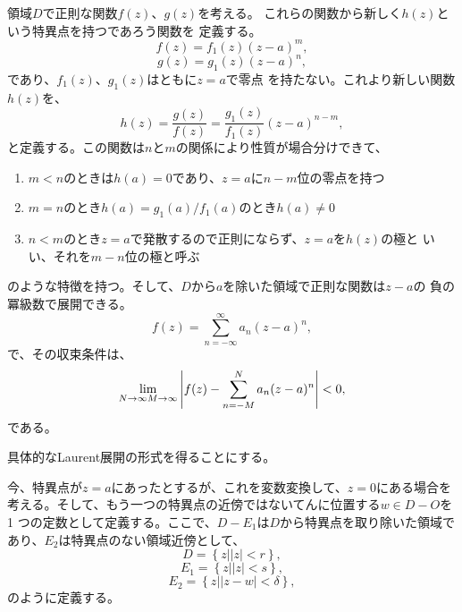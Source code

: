 領域$D$で正則な関数$f(z)$、$g(z)$を考える。
これらの関数から新しく$h(z)$という特異点を持つであろう関数を
定義する。
\begin{equation}
 f(z) = f_1 (z) (z - a)^m,
\end{equation}
\begin{equation}
 g(z) = g_1 (z) (z - a)^n,
\end{equation}
であり、$f_1(z)$、$g_1(z)$はともに$z=a$で零点
を持たない。これより新しい関数$h(z)$を、
\begin{equation}
 h(z) = \frac{g (z)}{f (z) }
  = \frac{g_1(z)}{f_1(z)}(z - a)^{n-m},
\end{equation}
と定義する。この関数は$n$と$m$の関係により性質が場合分けできて、

\begin{enumerate}
 \item $m < n$のときは$h(a)=0$であり、$z=a$に$n-m$位の零点を持つ
 \item $m=n$のとき$h(a)=g_1(a)/f_1(a)$のとき$h(a)\ne 0$
 \item $n < m$のとき$z=a$で発散するので正則にならず、$z=a$を$h(z)$の極と
       いい、それを$m-n$位の極と呼ぶ
\end{enumerate}
のような特徴を持つ。そして、$D$から$a$を除いた領域で正則な関数は$z-a$の
負の冪級数で展開できる。
\begin{equation}
 f(z) = \sum_{n=-\infty}^{\infty}
  a_n (z - a)^n,
\end{equation}
で、その収束条件は、
\begin{equation}
 \lim_{N\to \infty\\M\to \infty}
  \left|f(z) - \sum_{n=-M}^Na_n(z-a)^n\right| < 0,
\end{equation}
である。

具体的なLaurent展開の形式を得ることにする。

今、特異点が$z=a$にあったとするが、これを変数変換して、$z=0$にある場合を
考える。そして、もう一つの特異点の近傍ではないてんに位置する$w\in D-O$を1
つの定数として定義する。ここで、$D-E_1$は$D$から特異点を取り除いた領域で
あり、$E_2$は特異点のない領域近傍として、
\begin{equation}
 D = \left\{z\left|\right.|z| < r\right\},
\end{equation}
\begin{equation}
 E_1 = \left\{z\left|\right.|z| < s\right\},
\end{equation}
\begin{equation}
 E_2 = \left\{z\left|\right.|z-w| < \delta\right\},
\end{equation}
のように定義する。

